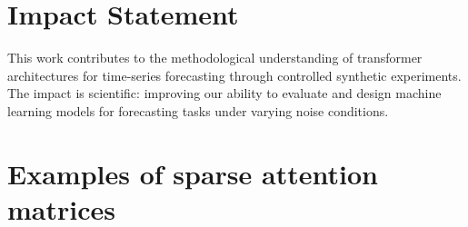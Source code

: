 \documentclass{article}
\begin{document}
\section*{Impact Statement}

This work contributes to the methodological understanding of transformer architectures for time-series forecasting through controlled synthetic experiments. The impact is scientific: improving our ability to evaluate and design machine learning models for forecasting tasks under varying noise conditions.





\appendix
\onecolumn

\section{Examples of sparse attention matrices}\label{app_attention}
\end{document}
